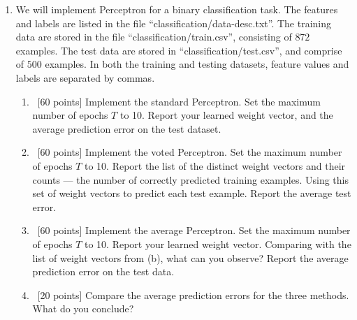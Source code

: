 \documentclass[12pt, fullpage,letterpaper]{article}
\begin{document}
\begin{enumerate}
\item We will implement  Perceptron for a binary classification task. The features and labels are listed in the file ``classification/data-desc.txt''. The training data are stored in the file ``classification/train.csv'', consisting of $872$ examples. The test data are stored in ``classification/test.csv'', and comprise of $500$ examples. In both the training and testing datasets, feature values and labels are separated by commas. 
\begin{enumerate}
\item~[60 points] Implement the standard Perceptron. Set the maximum number of epochs $T$ to 10. Report your learned weight vector, and the average prediction error on the test dataset. 
\item~[60 points] Implement the voted Perceptron. Set the maximum number of epochs $T$ to 10. Report the list of the distinct weight vectors and their counts --- the number of correctly predicted training examples. Using this set of weight vectors to predict each test example. Report the average test error. 
\item~[60 points] Implement the average Perceptron. Set the maximum number of epochs $T$ to 10. Report your learned weight vector. Comparing with the list of weight vectors from (b), what can you observe? Report the average prediction error on the test data. 
\item~[20 points] Compare the average prediction errors for the three methods. What do you conclude? 
\end{enumerate}

\end{enumerate}
\end{document}
